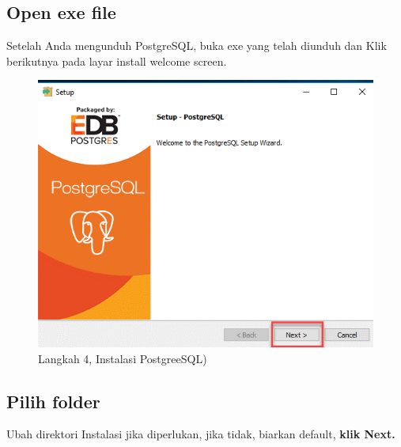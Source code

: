 \documentclass[
]{book}
\begin{document}
\hypertarget{open-exe-file}{%
\subsection{Open exe file}\label{open-exe-file}}

Setelah Anda mengunduh PostgreSQL, buka exe yang telah diunduh dan Klik berikutnya pada layar install welcome screen.

\begin{figure}

{\centering \includegraphics[width=1\linewidth]{./images/Bab1/Postgree3} 

}

\caption{Langkah 4, Instalasi PostgreeSQL)}\label{fig:install-posrgree4}
\end{figure}

\hypertarget{pilih-folder-1}{%
\subsection{Pilih folder}\label{pilih-folder-1}}

Ubah direktori Instalasi jika diperlukan, jika tidak, biarkan default, \textbf{klik Next.}
\end{document}
